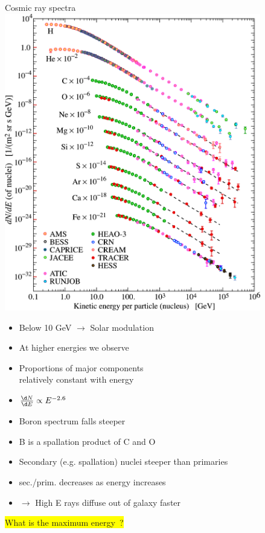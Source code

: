 \Tr
\begin{center}
{\blue Cosmic ray spectra}\\[5mm]
\includegraphics[keepaspectratio,height=13cm]{cr-low-e}
\end{center}

\newpage

\vspace*{1mm}
\begin{itemize}
\item[] Below 10 GeV $\rightarrow$ Solar modulation
\item[] At higher energies we observe
\item Proportions of major components\\
      relatively constant with energy
\item $\frac{\d N}{\d E} \propto E^{-2.6}$
\item Boron spectrum falls steeper
\item[] B is a spallation product of C and O
\item[] Secondary (e.g. spallation) nuclei steeper than primaries
\item sec./prim. decreases as energy increases
\item[] $\rightarrow$ High E rays diffuse out of galaxy faster
\end{itemize}
%
\colorbox{yellow}{What is the maximum energy~?}

